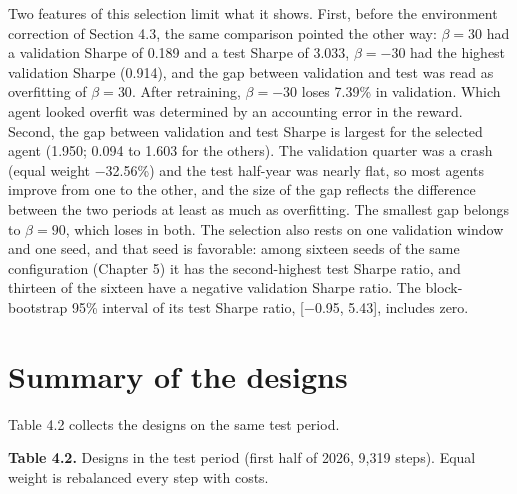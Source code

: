 \documentclass[12pt,a4paper]{report}
\begin{document}
Two features of this selection limit what it shows. First, before the
environment correction of Section 4.3, the same comparison pointed the
other way: \(\beta=30\) had a validation Sharpe of 0.189 and a test
Sharpe of 3.033, \(\beta=-30\) had the highest validation Sharpe
(0.914), and the gap between validation and test was read as overfitting
of \(\beta=30\). After retraining, \(\beta=-30\) loses 7.39\% in
validation. Which agent looked overfit was determined by an accounting
error in the reward. Second, the gap between validation and test Sharpe
is largest for the selected agent (1.950; 0.094 to 1.603 for the
others). The validation quarter was a crash (equal weight −32.56\%) and
the test half-year was nearly flat, so most agents improve from one to
the other, and the size of the gap reflects the difference between the
two periods at least as much as overfitting. The smallest gap belongs to
\(\beta=90\), which loses in both. The selection also rests on one
validation window and one seed, and that seed is favorable: among
sixteen seeds of the same configuration (Chapter 5) it has the
second-highest test Sharpe ratio, and thirteen of the sixteen have a
negative validation Sharpe ratio. The block-bootstrap 95\% interval of
its test Sharpe ratio, {[}−0.95, 5.43{]}, includes zero.

\section{Summary of the designs}\label{summary-of-the-designs}

Table 4.2 collects the designs on the same test period.

\textbf{Table 4.2.} Designs in the test period (first half of 2026,
9,319 steps). Equal weight is rebalanced every step with costs.
\end{document}
